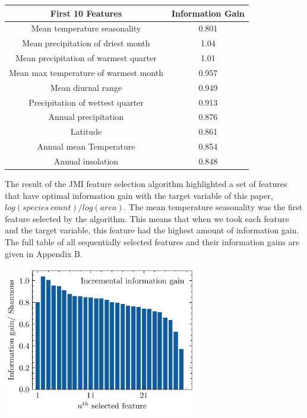 \documentclass[prl,showpacs,superscriptaddress,twocolumn,longbibliography]{revtex4-1}
\begin{document}
\begin{center}\begin{tabular}{||c c||}
 \hline
First 10 Features & Information Gain \\
 \hline\hline
 Mean temperature seasonality & 0.801\\ 
 \hline
 Mean precipitation of driest month & 1.04\\
  \hline
 Mean precipitation of warmest quarter &  1.01\\
 \hline
 Mean max temperature of warmest month &  0.957\\
 \hline
 Mean diurnal range & 0.949\\
 \hline
 Precipitation of wettest quarter & 0.913\\
 \hline
 Annual precipitation & 0.876\\
 \hline
 Latitude & 0.861\\
 \hline
 Annual mean Temperature & 0.854\\
 \hline 
 Annual insolation & 0.848\\[1ex]
\hline
\end{tabular}
\end{center}

The result of the JMI feature selection algorithm highlighted a set of features that have optimal information gain with the target variable of this paper, $log(species \: count)/log(area)$. The mean temperature seasonality was the first feature selected by the algorithm. This means that when we took each feature and the target variable, this feature had the highest amount of information gain. The full table of all sequentially selected features and their information gains are given in Appendix B.

\begin{center}\includegraphics[width=240pt]{Features.pdf}\end{center}
\end{document}
